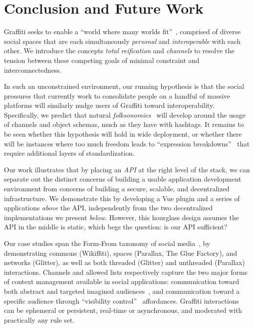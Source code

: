 \section{Conclusion and Future Work}

Graffiti seeks to enable a ``world where many worlds fit''~{\cite{escobarpluriverse}},
comprised of diverse social spaces that are each simultaneously \emph{personal}
and \emph{interoperable} with each other.
We introduce the concepts \emph{total reification} and \emph{channels}
to resolve the tension between these competing goals
of minimal constraint and interconnectedness.

In such an unconstrained environment,
our running hypothesis is
that the social pressures that currently work
to consolidate people on a handful of massive platforms
will similarly nudge users of Graffiti toward interoperability.
Specifically, we predict that natural \emph{folksonomies}~{\cite{folksonomy}} will
develop around the usage of channels and object schemas, much as they have with hashtags.
It remains to be seen whether this hypothesis will hold in wide deployment,
or whether there will be instances where too much freedom leads to
``expression breakdowns''~{\cite{expressionbreakdowns}}
that require additional layers of standardization.

Our work illustrates that by placing an \emph{API}
at the right level of the stack, we can separate out the distinct concerns
of building a usable application development environment
from concerns of building a secure, scalable, and decentralized infrastructure.
We demonstrate this by developing a Vue plugin and a series
of applications \emph{above} the API, independently from the
two decentralized implementations we present \emph{below}.
However, this hourglass design assumes the API in the middle is static,
which begs the question: is our API sufficient?

Our case studies span the Form-From taxonomy of social media~{\cite{formfrom}},
by demonstrating commons (Wikiffiti), spaces (Parallax, The Glue Factory), and networks (Glitter),
as well as both threaded (Glitter) and unthreaded (Parallax) interactions.
Channels and allowed lists respectively capture the two major
forms of context management available in social applications:
communication toward both abstract and targeted imagined audiences~{\cite{imaginedaudience}},
and communication toward a specific audience through ``visibility control''~{\cite{visibilitycontrol}} affordances.
Graffiti interactions can be ephemeral or persistent, real-time or asynchronous,
and moderated with practically any rule set.

